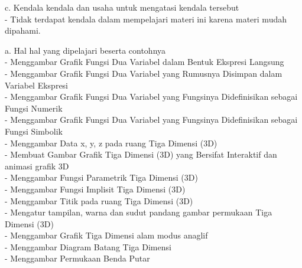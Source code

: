 \documentclass[a4paper,10pt]{article}
\begin{document}
\begin{eulernotebook}
\begin{eulercomment}
\begin{eulercomment}
\begin{eulercomment}
\begin{eulercomment}
\begin{eulercomment}
\begin{eulercomment}
\begin{eulercomment}
\begin{eulercomment}
\begin{eulercomment}
c. Kendala kendala dan usaha untuk mengatasi kendala tersebut\\
- Tidak terdapat kendala dalam mempelajari materi ini karena materi
mudah dipahami.\\
\end{eulercomment}
\eulersubheading{}
\begin{eulercomment}
a. Hal hal yang dipelajari beserta contohnya\\
- Menggambar Grafik Fungsi Dua Variabel dalam Bentuk Ekspresi Langsung\\
- Menggambar Grafik Fungsi Dua Variabel yang Rumusnya Disimpan dalam
Variabel Ekspresi\\
- Menggambar Grafik Fungsi Dua Variabel yang Fungsinya Didefinisikan
sebagai Fungsi Numerik\\
- Menggambar Grafik Fungsi Dua Variabel yang Fungsinya Didefinisikan
sebagai Fungsi Simbolik\\
- Menggambar Data \textdollar{}x\textdollar{}, \textdollar{}y\textdollar{}, \textdollar{}z\textdollar{} pada ruang Tiga Dimensi (3D)\\
- Membuat Gambar Grafik Tiga Dimensi (3D) yang Bersifat Interaktif dan
animasi grafik 3D\\
- Menggambar Fungsi Parametrik Tiga Dimensi (3D)\\
- Menggambar Fungsi Implisit Tiga Dimensi (3D)\\
- Menggambar Titik pada ruang Tiga Dimensi (3D)\\
- Mengatur tampilan, warna dan sudut pandang gambar permukaan Tiga
Dimensi (3D)\\
- Menggambar Grafik Tiga Dimensi alam modus anaglif\\
- Menggambar Diagram Batang Tiga Dimensi\\
- Menggambar Permukaan Benda Putar


\end{eulercomment}
\end{eulercomment}
\end{eulercomment}
\end{eulercomment}
\end{eulercomment}
\end{eulercomment}
\end{eulercomment}
\end{eulercomment}
\end{eulercomment}
\end{eulernotebook}
\end{document}
